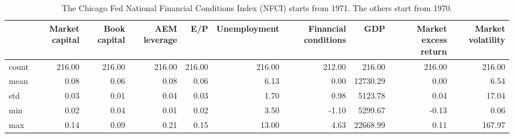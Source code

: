 \begin{table}
\caption{The Chicago Fed National Financial Conditions Index (NFCI) starts from 1971. The others start from 1970.}
\label{tab:Table 2.1}
\begin{tabular}{lrrrrrrrrr}
\toprule
 & Market capital & Book capital & AEM leverage & E/P & Unemployment & Financial conditions & GDP & Market excess return & Market volatility \\
\midrule
count & 216.00 & 216.00 & 216.00 & 216.00 & 216.00 & 212.00 & 216.00 & 216.00 & 216.00 \\
mean & 0.08 & 0.06 & 0.08 & 0.06 & 6.13 & 0.00 & 12730.29 & 0.00 & 6.54 \\
std & 0.03 & 0.01 & 0.04 & 0.03 & 1.70 & 0.98 & 5123.78 & 0.04 & 17.04 \\
min & 0.02 & 0.04 & 0.01 & 0.02 & 3.50 & -1.10 & 5299.67 & -0.13 & 0.06 \\
max & 0.14 & 0.09 & 0.21 & 0.15 & 13.00 & 4.63 & 22668.99 & 0.11 & 167.97 \\
\bottomrule
\end{tabular}
\end{table}
